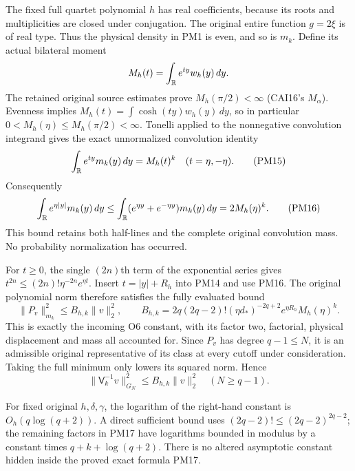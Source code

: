 \documentclass[11pt]{article}
\begin{document}
The fixed full quartet polynomial $h$ has real coefficients,
because its roots and multiplicities are closed under conjugation.
The original entire function $g=2\xi$ is of real type.  Thus the
physical density in PM1 is even, and so is $m_k$.  Define its
actual bilateral moment
\[
 M_h(t)=\int_\mathbb R e^{ty}w_h(y)\,dy.
\]
The retained original source estimates prove
$M_h(\pi/2)<\infty$ (CAI16's $M_\alpha$).  Evenness implies
$M_h(t)=\int\cosh(ty)w_h(y)\,dy$, so in particular
$0<M_h(\eta)\le M_h(\pi/2)<\infty$.
Tonelli applied to the nonnegative convolution integrand gives
the exact unnormalized convolution identity
\[
 \int_\mathbb R e^{ty}m_k(y)\,dy=M_h(t)^k\quad(t=\eta,-\eta).
                                                                    \tag{PM15}
\]
Consequently
\[
 \int_\mathbb R e^{\eta|y|}m_k(y)\,dy
 \le\int_\mathbb R(e^{\eta y}+e^{-\eta y})m_k(y)\,dy
             =2M_h(\eta)^k.                                   \tag{PM16}
\]
This bound retains both half-lines and the complete original
convolution mass.  No probability normalization has occurred.

For $t\ge0$, the single $(2n)$th term of the exponential series
gives $t^{2n}\le(2n)!\eta^{-2n}e^{\eta t}$.  Insert
$t=|y|+R_h$ into PM14 and use PM16.  The original polynomial
norm therefore satisfies the fully evaluated bound
\[
 \boxed{\|P_v\|_{m_k}^2\le B_{h,k}\|v\|_2^2,\qquad
 B_{h,k}=2q(2q-2)!(\eta d_*)^{-2q+2}
                    e^{\eta R_h}M_h(\eta)^k.}                 \tag{PM17}
\]
This is exactly the incoming O6 constant, with its factor two,
factorial, physical displacement and mass all accounted for.
Since $P_v$ has degree $q-1\le N$, it is an admissible original
representative of its class at every cutoff under consideration.
Taking the full minimum only lowers its squared norm.  Hence
\[
 \|\mathsf V_k^{-1}v\|_{G_N}^2\le B_{h,k}\|v\|_2^2
                           \quad(N\ge q-1).                   \tag{PM18}
\]

For fixed original $h,\delta,\gamma$, the logarithm of the
right-hand constant is $O_h(q\log(q+2))$.  A direct sufficient
bound uses $(2q-2)!\le(2q-2)^{2q-2}$; the remaining factors in
PM17 have logarithms bounded in modulus by a constant times
$q+k+\log(q+2)$.  There is no altered asymptotic constant hidden
inside the proved exact formula PM17.
\end{document}
